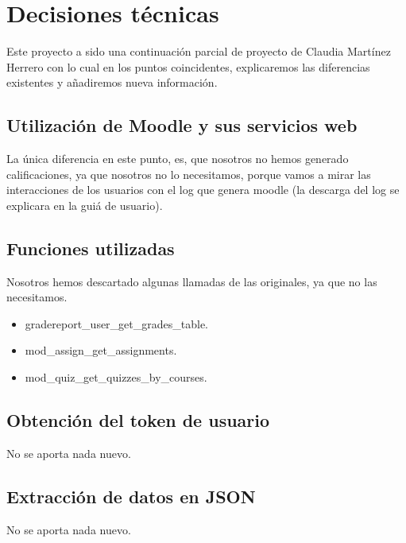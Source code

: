 \section{Decisiones técnicas}\label{decisiones-tecnicas}

Este proyecto a sido una continuación parcial de proyecto de Claudia Martínez Herrero \cite{claudia} con lo cual en los puntos coincidentes, explicaremos las diferencias existentes y añadiremos nueva información.

\subsection{Utilización de Moodle y sus servicios web}\label{utilizacióndemoodleysusserviciosweb}

La única diferencia en este punto, es, que nosotros no hemos generado calificaciones, ya que nosotros no lo necesitamos, porque vamos a mirar las interacciones de los usuarios con el log que genera moodle (la descarga del log se explicara en la guiá de usuario).

\subsection{Funciones utilizadas}\label{funciones-utilizadas}

Nosotros hemos descartado algunas llamadas de las originales, ya que no las necesitamos.

\begin{itemize}
	\tightlist
	\item
	gradereport\_user\_get\_grades\_table.
	\item
	mod\_assign\_get\_assignments.
	\item
	mod\_quiz\_get\_quizzes\_by\_courses.
\end{itemize}

\subsection{Obtención del token de usuario}\label{obtención-del-token-de-usuario}

No se aporta nada nuevo.

\subsection{Extracción de datos en JSON}\label{extracción-de-datos-en-json}

No se aporta nada nuevo.

